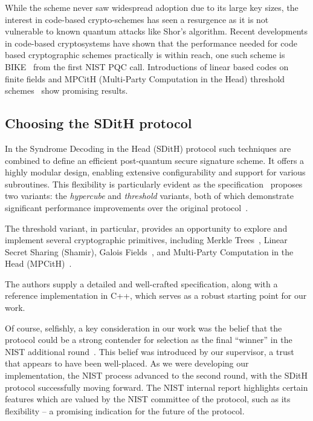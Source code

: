 \documentclass[11pt]{report}
\theoremstyle{definition}
\theoremstyle{plain}
\begin{document}
While the scheme never saw widespread adoption due to its large key sizes, the interest in code-based crypto-schemes has seen a resurgence as it is not vulnerable to known quantum attacks like Shor's algorithm. Recent developments in code-based cryptosystems have shown that the performance needed for code based cryptographic schemes practically is within reach, one such scheme is BIKE~\cite{BIKE_Spec_2024} from the first NIST PQC call. Introductions of linear based codes on finite fields and MPCitH (Multi-Party Computation in the Head) threshold schemes~\cite{baum2020concretely} show promising results.

\subsection{Choosing the SDitH protocol}
In the Syndrome Decoding in the Head (SDitH) protocol such techniques are combined to define an efficient post-quantum secure signature scheme. It offers a highly modular design, enabling extensive configurability and support for various subroutines. This flexibility is particularly evident as the specification~\cite{aguilarsyndrome11} proposes two variants: the \textit{hypercube} and \textit{threshold} variants, both of which demonstrate significant performance improvements over the original protocol~\cite{feneuil2022syndrome,aguilar2023return,feneuil2023threshold}.

The threshold variant, in particular, provides an opportunity to explore and implement several cryptographic primitives, including Merkle Trees~\cite{becker2008merkle}, Linear Secret Sharing (Shamir), Galois Fields~\cite{brownadvanced}, and Multi-Party Computation in the Head (MPCitH)~\cite{ishai2007zero,katz2018improved,baum2020concretely}.

The authors supply a detailed and well-crafted specification, along with a reference implementation in C++, which serves as a robust starting point for our work.

Of course, selfishly, a key consideration in our work was the belief that the protocol could be a strong contender for selection as the final ``winner'' in the NIST additional round~\cite{nistcall}. This belief was introduced by our supervisor, a trust that appears to have been well-placed. As we were developing our implementation, the NIST process advanced to the second round, with the SDitH protocol successfully moving forward. The NIST internal report highlights certain features which are valued by the NIST committee of the protocol, such as its flexibility  -- a promising indication for the future of the protocol.
\end{document}
